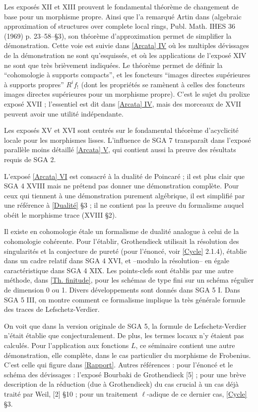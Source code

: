Les exposés XII et XIII prouvent le fondamental théorème de changement de base
pour un morphisme propre. Ainsi que l'a remarqué Artin dans (algebraic
approximation of structures over complete local rings, Publ. Math. IHES 36
(1969) p. 23--58--§3), son théorème d'approximation permet de simplifier la
démonstration. Cette voie est suivie dans \hyperref[I:4]{[Arcata] IV} où les
multiples dévissages de la démonstration ne sont qu'esquissés, et où les
applications de l'exposé XIV ne sont que très brièvement indiquées. Le théorème
permet de définir la ``cohomologie à supports compacts'', et les foncteurs
``images directes supérieures à supports propres'' $R^i f_!$ (dont les
propriétés se ramènent à celles des foncteurs images directes supérieures pour
un morphisme propre). C'est le sujet du prolixe exposé XVII ; l'essentiel est
dit dans \hyperref[I:4]{[Arcata] IV}, mais des morceaux de XVII peuvent avoir
une utilité indépendante.


Les exposés XV et XVI sont centrés sur le fondamental théorème d'acyclicité
locale pour les morphismes lisses. L'influence de SGA 7 transparaît dans
l'exposé parallèle moins détaillé \hyperref[I:5]{[Arcata] V}, qui contient aussi
la preuve des résultats requis de SGA 2.

L'exposé \hyperref[I:6]{[Arcata] VI} est consacré à la dualité de Poincaré ; il
est plus clair que SGA 4 XVIII mais ne prétend pas donner une démonstration
complète. Pour ceux qui tiennent à une démonstration purement algébrique, il est
simplifié par une référence à \hyperref[V]{[Dualité]} §3 ; il ne contient pas la
preuve du formalisme auquel obéit le morphisme trace (XVIII §2).

Il existe en cohomologie étale un formalisme de dualité analogue à celui de la
cohomologie cohérente. Pour l'établir, Grothendieck utilisait la résolution des
singularités et la conjecture de pureté (pour l'énoncé, voir
\hyperref[IV]{[Cycle]} 2.1.4), établie dans un cadre relatif dans SGA 4 XVI, et
--modulo la résolution-- en égale caractéristique dans SGA 4 XIX. Les
points-clefs sont établis par une autre méthode, dans
\hyperref[VII]{[Th. finitude]}, pour les schémas de type fini sur un schéma
régulier de dimension 0 ou 1. Divers développements sont donnés dans SGA 5 I.
Dans SGA 5 III, on montre comment ce formalisme implique la très générale
formule des traces de Lefschetz-Verdier.

On voit que dans la version originale de SGA 5, la formule de
Lefschetz-Verdier n'était établie que conjecturalement. De plus, les termes
locaux n'y étaient pas calculés. Pour l'application aux fonctions $L$, ce
séminaire contient une autre démonstration, elle complète, dans le cas
particulier du morphisme de Frobenius. C'est celle qui figure dans
\hyperref[II]{[Rapport]}. Autres références : pour l'énoncé et le schéma des
dévissages : l'exposé Bourbaki de Grothendieck [5] ; pour une brève description
de la réduction (due à Grothendieck) du cas crucial à un cas déjà traité par
Weil, [2] §10 ; pour un traitement $\ell$-adique de ce dernier cas,
\hyperref[IV]{[Cycle]} §3.

